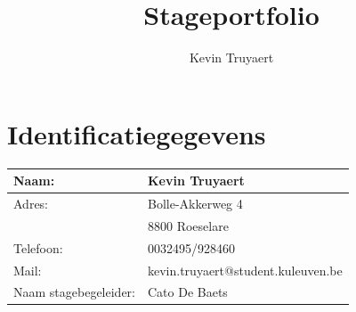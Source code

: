 \documentclass[a4paper,12pt,twoside]{article}%
\title{Stageportfolio}
\author{Kevin Truyaert}
\date{}
\begin{document}
	\maketitle
	
	
	\section*{Identificatiegegevens}
	\begin{center}
		\begin{tabular}{ll}
			\hline
			Naam: & Kevin Truyaert\\ \hline
			Adres: & Bolle-Akkerweg 4\\
			& 8800 Roeselare\\\hline
			Telefoon: & 0032495/928460\\\hline
			Mail: & kevin.truyaert@student.kuleuven.be\\\hline
			Naam stagebegeleider: & Cato De Baets\\ \hline
		\end{tabular}
	\end{center}
	
	\newpage
	\tableofcontents
	\newpage
	
	
	
	
	
	
	
	
\end{document}
